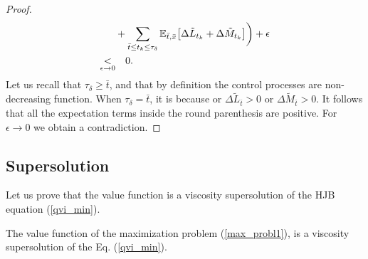 \begin{proof}
\begin{align}
    & + \sum_{\bar t \leq t_k \leq \tau_{\delta}}  \mathbb{E}_{\bar t, \bar x} \bigl[ \Delta \tilde L_{t_k} + \Delta \tilde M_{t_k} \bigr]   \biggr) + \epsilon \\ \nonumber
    \underset{\epsilon \to 0}{<} & \quad 0.   
\end{align}
Let us recall that $\tau_{\delta} \geq \bar t$, and that by definition the control processes are non-decreasing function. 
When $\tau_{\delta} = \bar t$, it is because or $\Delta \tilde L_{\bar t} > 0$ or $\Delta \tilde M_{\bar t} > 0$. 
It follows that all the expectation terms inside the round parenthesis are positive. For $\epsilon \to 0$ we obtain a contradiction.
\end{proof}




\subsection{Supersolution}

Let us prove that the value function is a viscosity supersolution of the HJB equation (\ref{qvi_min}). 

\begin{Theorem}\label{supersolution_th}
 The value function of the maximization problem (\ref{max_probl1}), is a viscosity supersolution of the Eq. (\ref{qvi_min}).
\end{Theorem}

